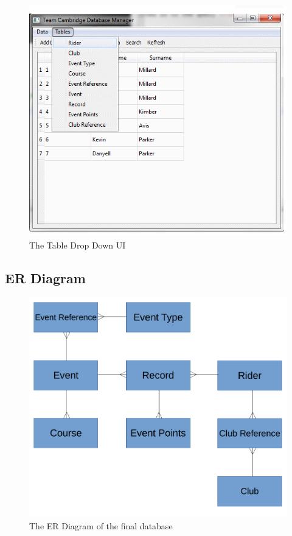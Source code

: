 \begin{figure}
\includegraphics[width=\textwidth]{./Maintenance/UI/TableDrop.png}
\caption{The Table Drop Down UI} \label{fig:TableDrop_UI}
\end{figure}

\clearpage
\subsection{ER Diagram}
\begin{figure}
\includegraphics[width=\textwidth]{./Maintenance/ER.pdf}
\caption{The ER Diagram of the final database} \label{fig:ER_Fin}
\end{figure}

